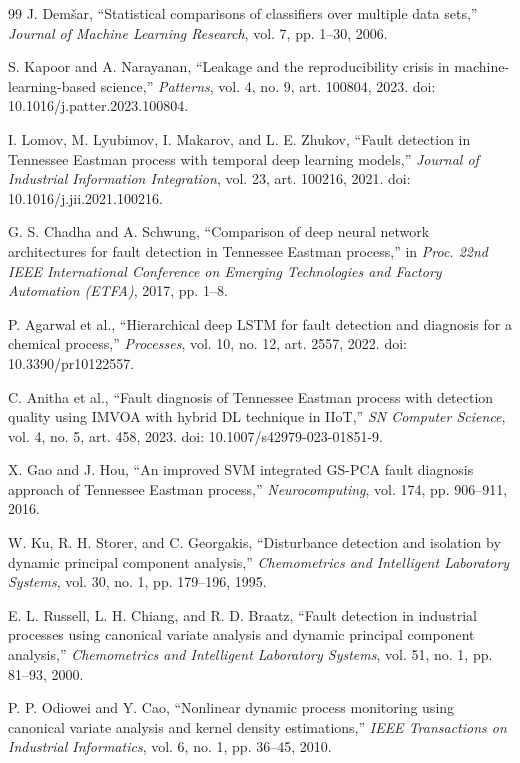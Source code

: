 \documentclass[10pt,twocolumn,a4paper]{article}
\begin{document}
\begin{thebibliography}{99}
J. Dem\v{s}ar, ``Statistical comparisons of classifiers over multiple data
sets,'' \emph{Journal of Machine Learning Research}, vol. 7, pp. 1--30, 2006.

S. Kapoor and A. Narayanan, ``Leakage and the reproducibility crisis in
machine-learning-based science,'' \emph{Patterns}, vol. 4, no. 9, art. 100804,
2023. doi: 10.1016/j.patter.2023.100804.

I. Lomov, M. Lyubimov, I. Makarov, and L. E. Zhukov, ``Fault detection in
Tennessee Eastman process with temporal deep learning models,'' \emph{Journal
of Industrial Information Integration}, vol. 23, art. 100216, 2021.
doi: 10.1016/j.jii.2021.100216.

G. S. Chadha and A. Schwung, ``Comparison of deep neural network architectures
for fault detection in Tennessee Eastman process,'' in \emph{Proc. 22nd IEEE
International Conference on Emerging Technologies and Factory Automation
(ETFA)}, 2017, pp. 1--8.

P. Agarwal et al., ``Hierarchical deep LSTM for fault detection and diagnosis
for a chemical process,'' \emph{Processes}, vol. 10, no. 12, art. 2557, 2022.
doi: 10.3390/pr10122557.

C. Anitha et al., ``Fault diagnosis of Tennessee Eastman process with detection
quality using IMVOA with hybrid DL technique in IIoT,'' \emph{SN Computer
Science}, vol. 4, no. 5, art. 458, 2023. doi: 10.1007/s42979-023-01851-9.

X. Gao and J. Hou, ``An improved SVM integrated GS-PCA fault diagnosis approach
of Tennessee Eastman process,'' \emph{Neurocomputing}, vol. 174, pp. 906--911,
2016.

W. Ku, R. H. Storer, and C. Georgakis, ``Disturbance detection and isolation by
dynamic principal component analysis,'' \emph{Chemometrics and Intelligent
Laboratory Systems}, vol. 30, no. 1, pp. 179--196, 1995.

E. L. Russell, L. H. Chiang, and R. D. Braatz, ``Fault detection in industrial
processes using canonical variate analysis and dynamic principal component
analysis,'' \emph{Chemometrics and Intelligent Laboratory Systems}, vol. 51,
no. 1, pp. 81--93, 2000.

P. P. Odiowei and Y. Cao, ``Nonlinear dynamic process monitoring using
canonical variate analysis and kernel density estimations,'' \emph{IEEE
Transactions on Industrial Informatics}, vol. 6, no. 1, pp. 36--45, 2010.

\end{thebibliography}
\end{document}
